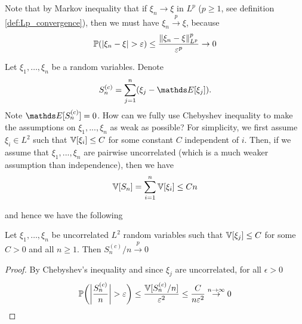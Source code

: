 Note that by Markov inequality that if $\xi_n \to \xi$ in $L^p$ ($p\geq 1$, see definition \ref{def:Lp_convergence}), then we must have $\xi_n \xrightarrow{p} \xi$, because
\begin{equation}
    \mathbb{P}(|\xi_n - \xi| > \varepsilon) \leq \frac{\left\| \xi_n - \xi \right\|_{L^p}^p}{\varepsilon^p} \to 0
\end{equation}

Let $\xi_1, \dots, \xi_n$ be a random variables. Denote
\begin{equation*}
    S_n^{(c)} = \sum_{j=1}^n (\xi_j - \E[\xi_j]).
\end{equation*}
Note $\E[S_n^{(c)}] = 0$. How can we fully use Chebyshev inequality to make the assumptions on $\xi_1,...,\xi_n$ as weak as possible? For simplicity, we first assume $\xi_i \in L^2$ such that $\mathbb{V}[\xi_i] \leq C$ for some constant $C$ independent of $i$. Then, if we assume that $\xi_1,...,\xi_n$ are pairwise uncorrelated (which is a much weaker assumption than independence), then we have 
\begin{equation}
    \mathbb{V}[S_n] = \sum_{i=1}^n \mathbb{V}[\xi_i] \leq Cn
\end{equation}

and hence we have the following 


\begin{theorem} \label{thm:WLLN2}
Let $\xi_1, \dots, \xi_n$ be uncorrelated $L^2$ random variables such that $\mathbb{V}[\xi_j] \le C$ for some $C > 0$ and all $n \ge 1$. Then $S_n^{(c)}/n \xrightarrow{p} 0$
\end{theorem}
\begin{proof}
By Chebyshev's inequality and since $\xi_j$ are uncorrelated, for all $\epsilon > 0$
\begin{equation}
    \mathbb{P}  \bigg(\bigg|\frac{S_n^{(c)}}{n}\bigg| > \varepsilon\bigg) \leq \frac{\mathbb{V}[S_n^{(c)}/n]}{\varepsilon^2} \leq 
    \frac{C}{n \varepsilon^2} \overset{n \to \infty}{\to} 0
\end{equation}
\end{proof}


